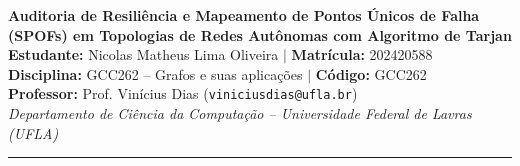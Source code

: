 \documentclass[10pt,a4paper]{article}
\begin{document}
\begin{center}
    {\large \textbf{Auditoria de Resiliência e Mapeamento de Pontos Únicos de Falha (SPOFs) em Topologias de Redes Autônomas com Algoritmo de Tarjan}}\\[0.15cm]
    \footnotesize
    \textbf{Estudante:} Nicolas Matheus Lima Oliveira \quad $\vert$ \quad \textbf{Matrícula:} 202420588\\
    \textbf{Disciplina:} GCC262 -- Grafos e suas aplicações \quad $\vert$ \quad \textbf{Código:} GCC262\\
    \textbf{Professor:} Prof. Vinícius Dias (\texttt{viniciusdias@ufla.br})\\
    \textit{Departamento de Ciência da Computação -- Universidade Federal de Lavras (UFLA)}\\[0.1cm]
    \rule{\textwidth}{0.6pt}
\end{center}
\vspace{-0.3cm}
\end{document}
